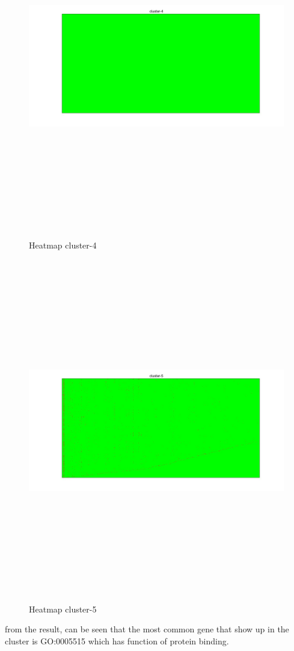 \begin{figure}[htbp]
	\centering
	\includegraphics[width=\linewidth,height=15cm,keepaspectratio]{analisis/cluster-4.jpg}
	\caption{Heatmap cluster-4}
	\label{pic:cluster-4}
\end{figure}


\begin{figure}[htbp]
	\centering
	\includegraphics[width=\linewidth,height=15cm,keepaspectratio]{analisis/cluster-5.jpg}
	\caption{Heatmap cluster-5}
	\label{pic:cluster-5}
\end{figure}

from the result, can be seen that the most common gene that show up in the cluster is GO:0005515 which has function of protein binding.

